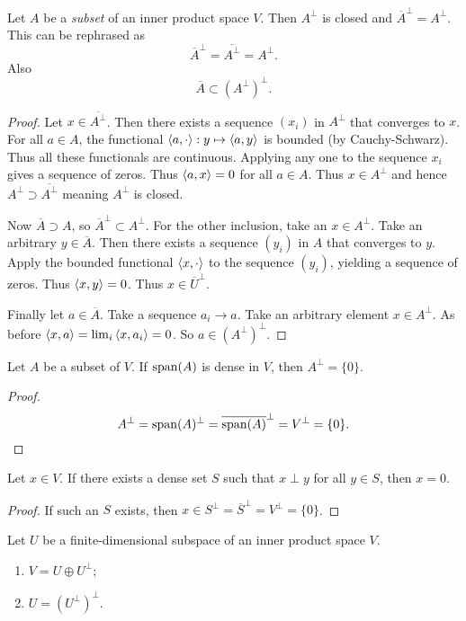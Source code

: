 \begin{proposition} \label{orthogonalComplementClosed}
Let $A$ be a \emph{subset} of an inner product space $V$. Then $A^\perp$ is closed and $\overline{A}^\perp = A^\perp$. This can be rephrased as
\[ \overline{A}^\perp = \overline{A^\perp} = A^\perp. \]
Also
\[\overline{A} \subset (A^\perp)^\perp. \]
\end{proposition}
\begin{proof}
Let $x\in \overline{A^\perp}$. Then there exists a sequence $(x_i)$ in $A^\perp$ that converges to $x$. For all $a\in A$, the functional $\left\langle a,\cdot \right\rangle:y\mapsto \left\langle a,y \right\rangle$ is bounded (by Cauchy-Schwarz). Thus all these functionals are continuous. Applying any one to the sequence $x_i$ gives a sequence of zeros. Thus $\left\langle a,x \right\rangle = 0$ for all $a\in A$. Thus $x\in A^\perp$ and hence $A^\perp \supset \overline{A^\perp}$ meaning $A^\perp$ is closed.

Now $\overline{A}\supset A$, so $\overline{A}^\perp \subset A^\perp$. For the other inclusion, take an $x\in A^\perp$. Take an arbitrary $y\in \overline{A}$. Then there exists a sequence $(y_i)$ in $A$ that converges to $y$. Apply the bounded functional $\left\langle x,\cdot \right\rangle$ to the sequence $(y_i)$, yielding a sequence of zeros. Thus $\left\langle x,y \right\rangle=0$. Thus $x\in \overline{U}^\perp$.

Finally let $a\in \overline{A}$. Take a sequence $a_i\to a$. Take an arbitrary element $x\in A^\perp$. As before $\left\langle x,a \right\rangle = \lim_i\left\langle x,a_i \right\rangle = 0$. So $a\in (A^\perp)^\perp$.
\end{proof}
\begin{corollary} \label{orthogonalComplementDenseSpace}
Let $A$ be a subset of $V$. If $\operatorname{span}(A)$ is dense in $V$, then $A^\perp = \{0\}$. 
\end{corollary}
\begin{proof}
\[ A^\perp = \operatorname{span}(A)^\perp = \overline{\operatorname{span}(A)}^\perp = V^\perp = \{0\}. \]
\end{proof}
\begin{corollary} \label{perpToDenseSet}
Let $x\in V$. If there exists a dense set $S$ such that $x\perp y$ for all $y\in S$, then $x=0$.
\end{corollary}
\begin{proof}
If such an $S$ exists, then $x\in S^\perp = \overline{S}^\perp = V^\perp = \{0\}$.
\end{proof}
\begin{proposition}
Let $U$ be a finite-dimensional subspace of an inner product space $V$.
\begin{enumerate}
\item $V=U\oplus U^\perp$;
\item $U = (U^\perp)^\perp$.
\end{enumerate}
\end{proposition}
